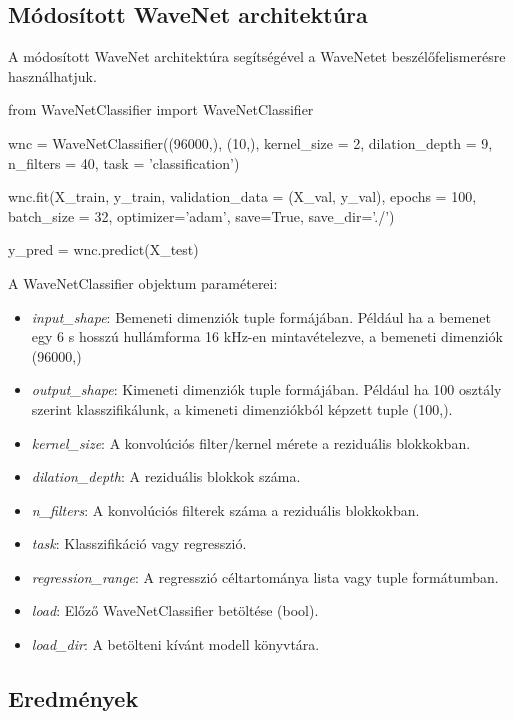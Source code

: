 \subsection{Módosított WaveNet architektúra}

A módosított WaveNet architektúra segítségével a WaveNetet beszélőfelismerésre használhatjuk.
\bigskip
\begin{python}
	from WaveNetClassifier import WaveNetClassifier
	
	wnc = WaveNetClassifier((96000,), (10,), kernel_size = 2, dilation_depth = 9,
	                         n_filters = 40, task = 'classification')
	
	wnc.fit(X_train, y_train, validation_data = (X_val, y_val), epochs = 100,
	        batch_size = 32, optimizer='adam', save=True, save_dir='./')
	
	y_pred = wnc.predict(X_test)
	
\end{python}
\bigskip
A WaveNetClassifier objektum paraméterei:

\begin{itemize}
	\item \emph{input\_shape}: Bemeneti dimenziók tuple formájában. Például ha a bemenet egy 6 s hosszú hullámforma 16 kHz-en mintavételezve, a bemeneti dimenziók (96000,)
	\item \emph{output\_shape}: Kimeneti dimenziók tuple formájában. Például ha 100 osztály szerint klasszifikálunk, a kimeneti dimenziókból képzett tuple (100,).
	\item \emph{kernel\_size}: A konvolúciós filter/kernel mérete a reziduális blokkokban.
	\item \emph{dilation\_depth}: A reziduális blokkok száma.
	\item \emph{n\_filters}: A konvolúciós filterek száma a reziduális blokkokban.
	\item \emph{task}: Klasszifikáció vagy regresszió.
	\item \emph{regression\_range}: A regresszió céltartománya lista vagy tuple formátumban.
	\item \emph{load}: Előző WaveNetClassifier betöltése (bool).
	\item \emph{load\_dir}: A betölteni kívánt modell könyvtára.
\end{itemize}

\subsection{Eredmények}

